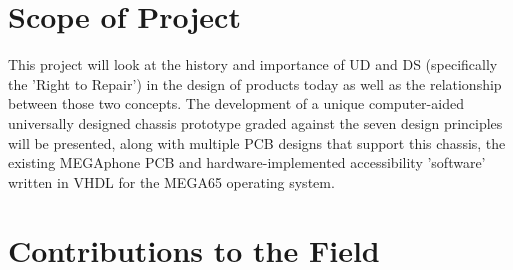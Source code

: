 \section{Scope of Project}

This project will look at the history and importance of UD and DS (specifically the 'Right to Repair') in the design of products today as well as the relationship between those two concepts.
The development of a unique computer-aided universally designed chassis prototype graded against the seven design principles \cite{sevenprinciples} will be presented, along with multiple PCB designs that support this chassis, the existing MEGAphone PCB and hardware-implemented accessibility 'software' written in VHDL for the MEGA65 operating system.

\section{Contributions to the Field} %

